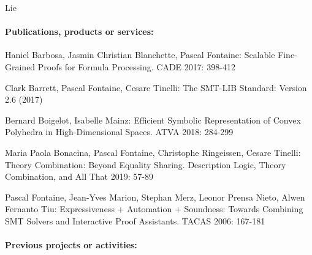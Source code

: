\begin{sitedescription}{Lie}
\paragraph{Publications, products or services:}


\begin{compactitem}
\item Haniel Barbosa, Jasmin Christian Blanchette, Pascal Fontaine:
Scalable Fine-Grained Proofs for Formula Processing. CADE 2017: 398-412

\item Clark Barrett, Pascal Fontaine, Cesare Tinelli: The SMT-LIB Standard: Version 2.6 (2017)

\item Bernard Boigelot, Isabelle Mainz:
Efficient Symbolic Representation of Convex Polyhedra in High-Dimensional Spaces. ATVA 2018: 284-299

\item Maria Paola Bonacina, Pascal Fontaine, Christophe Ringeissen, Cesare Tinelli:
Theory Combination: Beyond Equality Sharing. Description Logic, Theory Combination, and All That 2019: 57-89


\item Pascal Fontaine, Jean-Yves Marion, Stephan Merz, Leonor Prensa Nieto, Alwen Fernanto Tiu:
  Expressiveness + Automation + Soundness: Towards Combining SMT Solvers and Interactive Proof Assistants. TACAS 2006: 167-181

\end{compactitem}

\paragraph{Previous projects or activities:}


\end{sitedescription}
